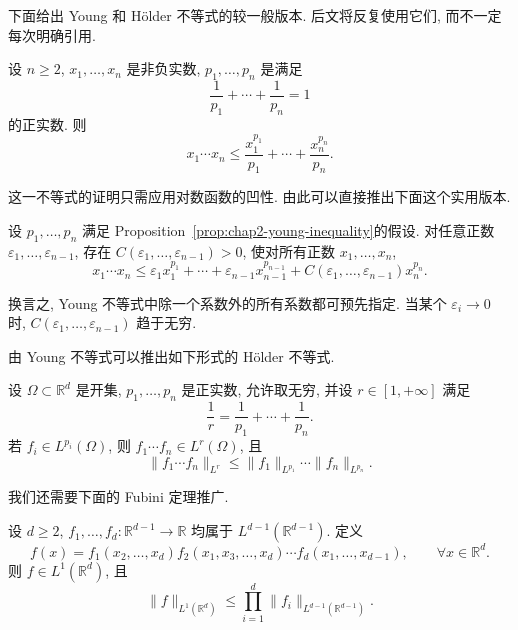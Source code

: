 下面给出 Young 和 Hölder 不等式的较一般版本. 后文将反复使用它们, 而不一定每次明确引用.

\begin{Proposition}
\label{prop:chap2-young-inequality}
设 $n\geq2$, $x_1,\ldots,x_n$ 是非负实数, $p_1,\ldots,p_n$ 是满足
\[
  \frac1{p_1}+\cdots+\frac1{p_n}=1
\]
的正实数. 则
\[
  x_1\cdots x_n\leq\frac{x_1^{p_1}}{p_1}+\cdots+\frac{x_n^{p_n}}{p_n}.
\]
\end{Proposition}

这一不等式的证明只需应用对数函数的凹性. 由此可以直接推出下面这个实用版本.

\begin{Corollary}
\label{cor:chap2-young-epsilon}
设 $p_1,\ldots,p_n$ 满足 Proposition~\ref{prop:chap2-young-inequality}的假设. 对任意正数 $\varepsilon_1,\ldots,\varepsilon_{n-1}$, 存在 $C(\varepsilon_1,\ldots,\varepsilon_{n-1})>0$, 使对所有正数 $x_1,\ldots,x_n$,
\[
x_1\cdots x_n\leq\varepsilon_1x_1^{p_1}+\cdots+\varepsilon_{n-1}x_{n-1}^{p_{n-1}}
+C(\varepsilon_1,\ldots,\varepsilon_{n-1})x_n^{p_n}.
\]
\end{Corollary}

换言之, Young 不等式中除一个系数外的所有系数都可预先指定. 当某个 $\varepsilon_i\to0$ 时, $C(\varepsilon_1,\ldots,\varepsilon_{n-1})$ 趋于无穷.

由 Young 不等式可以推出如下形式的 Hölder 不等式.

\begin{Proposition}
\label{prop:chap2-holder-inequality}
设 $\Omega\subset\mathbb{R}^d$ 是开集, $p_1,\ldots,p_n$ 是正实数, 允许取无穷, 并设 $r\in[1,+\infty]$ 满足
\[
  \frac1r=\frac1{p_1}+\cdots+\frac1{p_n}.
\]
若 $f_i\in L^{p_i}(\Omega)$, 则 $f_1\cdots f_n\in L^r(\Omega)$, 且
\[
  \|f_1\cdots f_n\|_{L^r}\leq\|f_1\|_{L^{p_1}}\cdots\|f_n\|_{L^{p_n}}.
\]
\end{Proposition}

我们还需要下面的 Fubini 定理推广.

\begin{Proposition}
\label{prop:chap2-generalized-fubini}
设 $d\geq2$, $f_1,\ldots,f_d:\mathbb{R}^{d-1}\to\mathbb{R}$ 均属于 $L^{d-1}(\mathbb{R}^{d-1})$. 定义
\[
f(x)=f_1(x_2,\ldots,x_d)f_2(x_1,x_3,\ldots,x_d)\cdots f_d(x_1,\ldots,x_{d-1}),
\qquad\forall x\in\mathbb{R}^d.
\]
则 $f\in L^1(\mathbb{R}^d)$, 且
\[
  \|f\|_{L^1(\mathbb{R}^d)}\leq\prod_{i=1}^d\|f_i\|_{L^{d-1}(\mathbb{R}^{d-1})}.
\]
\end{Proposition}

